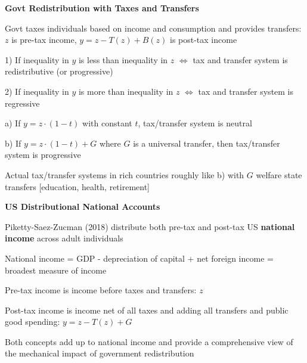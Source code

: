 \documentclass[landscape]{slides}
\begin{document}
\begin{slide}

\end{slide}

\begin{slide}

\end{slide}

\begin{slide}
\begin{center}
{\bf Govt Redistribution with Taxes and Transfers}
\end{center}

Govt taxes individuals based on income and consumption and
provides transfers: $z$ is pre-tax income, $y=z-T(z)+B(z)$ is
post-tax income

1) If inequality in $y$ is less than inequality in $z$
$\Leftrightarrow$ tax and transfer system is redistributive (or
progressive)

2) If inequality in $y$ is more than inequality in $z$
$\Leftrightarrow$ tax and transfer system is regressive

a) If $y=z \cdot (1-t)$ with constant $t$, tax/transfer system is
neutral

b) If $y=z \cdot (1-t)+G$ where $G$ is a universal 
transfer, then tax/transfer system is progressive 

Actual tax/transfer systems in rich countries roughly like b) with $G$ welfare
state transfers [education, health, retirement]
\end{slide}

\begin{slide}
\begin{center}
{\bf US Distributional National Accounts}
\end{center}
Piketty-Saez-Zucman (2018) distribute both pre-tax and post-tax US \textbf{national income} across adult individuals 

National income = GDP - depreciation of capital + net foreign income = broadest measure of income

Pre-tax income is income before taxes and transfers: $z$

Post-tax income is income net of all taxes and adding all transfers and public good spending: $y=z-T(z)+G$

Both concepts add up to national income and provide a comprehensive view of the mechanical impact
of government redistribution

\end{slide}
\end{document}
